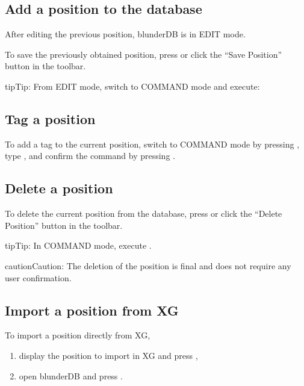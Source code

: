 \documentclass[letterpaper,10pt,english]{sphinxmanual}
\begin{document}
\subsection{Add a position to the database}
\label{\detokenize{guide_utilisateur:ajouter-une-position-a-la-base-de-donnees}}
\sphinxAtStartPar
After editing the previous position, blunderDB is in EDIT mode.

\sphinxAtStartPar
To save the previously obtained position, press  or click the “Save Position” button in the toolbar.

\begin{sphinxadmonition}{tip}{Tip:}
\sphinxAtStartPar
From EDIT mode, switch to COMMAND mode and execute: 
\end{sphinxadmonition}


\subsection{Tag a position}
\label{\detokenize{guide_utilisateur:etiqueter-une-position}}
\sphinxAtStartPar
To add a tag  to the current position, switch to COMMAND mode by pressing , type , and confirm the command by pressing .


\subsection{Delete a position}
\label{\detokenize{guide_utilisateur:supprimer-une-position}}
\sphinxAtStartPar
To delete the current position from the database, press  or click the “Delete Position” button in the toolbar.

\begin{sphinxadmonition}{tip}{Tip:}
\sphinxAtStartPar
In COMMAND mode, execute .
\end{sphinxadmonition}

\begin{sphinxadmonition}{caution}{Caution:}
\sphinxAtStartPar
The deletion of the position is final and does not require any user confirmation.
\end{sphinxadmonition}


\subsection{Import a position from XG}
\label{\detokenize{guide_utilisateur:import-une-position-depuis-xg}}
\sphinxAtStartPar
To import a position directly from XG,
\begin{enumerate}
%
\item {} 
\sphinxAtStartPar
display the position to import in XG and press ,

\item {} 
\sphinxAtStartPar
open blunderDB and press .

\end{enumerate}
\end{document}
